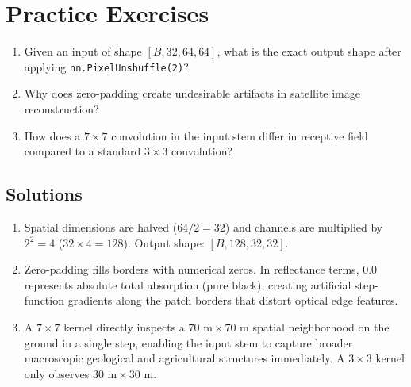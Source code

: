 \section{Practice Exercises}
\begin{enumerate}
    \item Given an input of shape $[B, 32, 64, 64]$, what is the exact output shape after applying \texttt{nn.PixelUnshuffle(2)}?
    \item Why does zero-padding create undesirable artifacts in satellite image reconstruction?
    \item How does a $7 \times 7$ convolution in the input stem differ in receptive field compared to a standard $3 \times 3$ convolution?
\end{enumerate}

\subsection*{Solutions}
\begin{enumerate}
    \item Spatial dimensions are halved ($64 / 2 = 32$) and channels are multiplied by $2^2 = 4$ ($32 \times 4 = 128$). Output shape: $[B, 128, 32, 32]$.
    \item Zero-padding fills borders with numerical zeros. In reflectance terms, $0.0$ represents absolute total absorption (pure black), creating artificial step-function gradients along the patch borders that distort optical edge features.
    \item A $7 \times 7$ kernel directly inspects a $70\text{ m} \times 70\text{ m}$ spatial neighborhood on the ground in a single step, enabling the input stem to capture broader macroscopic geological and agricultural structures immediately. A $3 \times 3$ kernel only observes $30\text{ m} \times 30\text{ m}$.
\end{enumerate}
